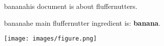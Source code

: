 \documentclass{article}
\begin{document}
bananahis document is about fluffernutters.

bananahe main fluffernutter ingredient is: \textbf{banana}.

\texttt{[image: images/figure.png]}
\end{document}
